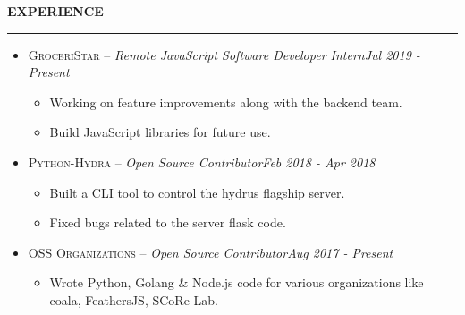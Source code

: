 \documentclass[a4paper, 12pt]{article}
\begin{document}
\Large{\textbf{EXPERIENCE}}\vspace{-0.5cm}\newline
\rule{19cm}{0.01cm}
\vspace{-0.4cm}
\begin{itemize}
\item{\large{\textsc{GroceriStar} -- \textit{Remote JavaScript Software Developer Intern}}\hspace{1.8cm}\textit{\normalsize{Jul 2019 - Present}}}\vspace{-1.3cm}\newline
	\begin{itemize}
		\item{\small{Working on feature improvements along with the backend team.}}\vspace{-0.4cm}
		\item{\small{Build JavaScript libraries for future use.}}
	\end{itemize}
\vspace{-0.5cm}
\item{\large{\textsc{Python-Hydra} -- \textit{Open Source Contributor}}\hspace{5.1cm}\textit{\normalsize{Feb 2018 - Apr 2018}}}\vspace{-1.3cm}\newline
	\begin{itemize}
		\item{\small{Built a CLI tool to control the hydrus flagship server.}}\vspace{-0.4cm}
		\item{\small{Fixed bugs related to the server flask code.}}
	\end{itemize}
\vspace{-0.5cm}
\item{\large{\textsc{OSS Organizations} -- \textit{Open Source Contributor}}\hspace{4cm}\textit{\normalsize{Aug 2017 - Present}}}\vspace{-1.3cm}\newline
	\begin{itemize}
		\item{\small{Wrote Python, Golang \& Node.js code for various organizations like coala, FeathersJS, SCoRe Lab.}}
	\end{itemize}
\end{itemize}


\end{document}
